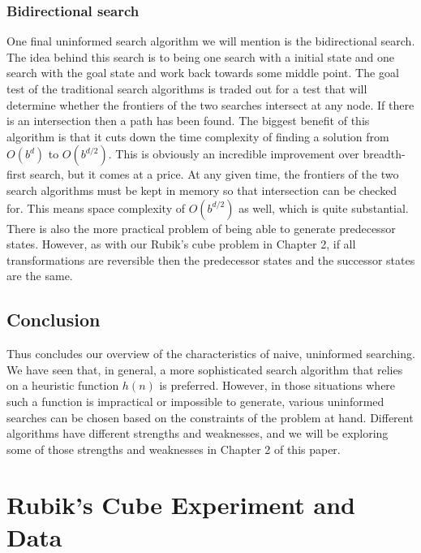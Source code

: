 \documentclass[a4paper,11pt]{report}
\begin{document}
\subsection{Bidirectional search}
One final uninformed search algorithm we will mention is the bidirectional
search.  The idea behind this search is to being one search with a initial
state and one search with the goal state and work back towards some middle
point.  The goal test of the traditional search algorithms is traded out for a
test that will determine whether the frontiers of the two searches intersect at
any node.  If there is an intersection then a path has been found.\cite{norvig}
The biggest benefit of this algorithm is that it cuts down the time complexity
of finding a solution from $O(b^d)$ to $O(b^{d / 2})$.  This is obviously an
incredible improvement over breadth-first search, but it comes at a price.  At
any given time, the frontiers of the two search algorithms must be kept in
memory so that intersection can be checked for.  This means space complexity of
$O(b^{d / 2})$ as well, which is quite substantial. There is also the more
practical problem of being able to generate predecessor states.  However, as
with our Rubik's cube problem in Chapter 2, if all transformations are
reversible then the predecessor states and the successor states are the
same.\cite{norvig}

\section{Conclusion}
Thus concludes our overview of the characteristics of naive, uninformed
searching.  We have seen that, in general, a more sophisticated search
algorithm that relies on a heuristic function $h(n)$ is preferred.  However, in
those situations where such a function is impractical or impossible to
generate, various uninformed searches can be chosen based on the constraints of
the problem at hand.  Different algorithms have different strengths and
weaknesses, and we will be exploring some of those strengths and weaknesses in
Chapter 2 of this paper.

\chapter{Rubik's Cube Experiment and Data}
\end{document}
